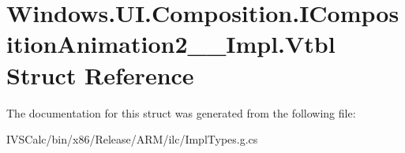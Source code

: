 \hypertarget{struct_windows_1_1_u_i_1_1_composition_1_1_i_composition_animation2_____impl_1_1_vtbl}{}\section{Windows.\+U\+I.\+Composition.\+I\+Composition\+Animation2\+\_\+\+\_\+\+Impl.\+Vtbl Struct Reference}
\label{struct_windows_1_1_u_i_1_1_composition_1_1_i_composition_animation2_____impl_1_1_vtbl}


The documentation for this struct was generated from the following file\+:\begin{DoxyCompactItemize}
\item 
I\+V\+S\+Calc/bin/x86/\+Release/\+A\+R\+M/ilc/Impl\+Types.\+g.\+cs\end{DoxyCompactItemize}
